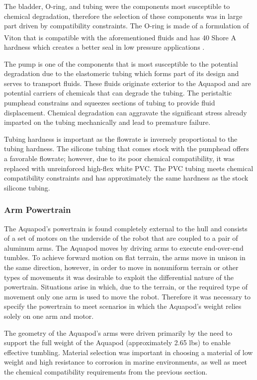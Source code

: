 		The bladder, O-ring, and tubing were the components most susceptible to chemical degradation, therefore the selection of these components was in large part driven by compatibility constraints. The O-ring is made of a formulation of Viton\textsuperscript{\textregistered} that is compatible with the aforementioned fluids and has 40 Shore A hardness which creates a better seal in low pressure applications \cite{Parker-Hannifin2007}.
	
		The pump is one of the components that is most susceptible to the potential degradation due to the elastomeric tubing which forms part of its design and serves to transport fluids. These fluids originate exterior to the Aquapod and are potential carriers of chemicals that can degrade the tubing. The peristaltic pumphead constrains and squeezes sections of tubing to provide fluid displacement. Chemical degradation can aggravate the significant stress already imparted on the tubing mechanically and lead to premature failure.  
	
		Tubing hardness is important as the flowrate is inversely proportional to the tubing hardness. The silicone tubing that comes stock with the pumphead offers a favorable flowrate; however, due to its poor chemical compatibility, it was replaced with unreinforced high-flex white PVC.  The PVC tubing meets chemical compatibility constraints and has approximately the same hardness as the stock silicone tubing. 
		
	\subsubsection{Arm Powertrain}
	\label{arm_motors}
		The Aquapod's powertrain is found completely external to the hull and consists of a set of motors on the underside of the robot that are coupled to a pair of aluminum arms. The Aquapod moves by driving arms to execute end-over-end tumbles. To achieve forward motion on flat terrain, the arms move in unison in the same direction, however, in order to move in nonuniform terrain or other types of movements it was desirable to exploit the differential nature of the powertrain. Situations arise in which, due to the terrain, or the required type of movement only one arm is used to move the robot.  Therefore it was necessary to specify the powertrain to meet scenarios in which the Aquapod's weight relies solely on one arm and motor. 
		
		The geometry of the Aquapod's arms were driven primarily by the need to support the full weight of the Aquapod (approximately 2.65 lbs) to enable effective tumbling. Material selection was important in choosing a material of low weight and high resistance to corrosion in marine environments, as well as meet the chemical compatibility requirements from the previous section. 

